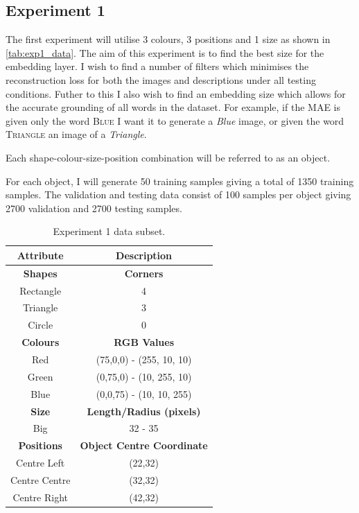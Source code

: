 \subsection{Experiment 1}
The first experiment will utilise 3 colours, 3 positions and 1 size as shown in \autoref{tab:exp1_data}. The aim of this experiment is to find the best size for the embedding layer. I wish to find a number of filters which minimises the reconstruction loss for both the images and descriptions under all testing conditions. Futher to this I also wish to find an embedding size which allows for the accurate grounding of all words in the dataset. For example, if the \ac{MAE} is given only the word \textsc{Blue} I want it to generate a \textit{Blue} image, or given the word \textsc{Triangle} an image of a \textit{Triangle}. 

Each shape-colour-size-position combination will be referred to as an object.

For each object, I will generate 50 training samples giving a total of 1350 training samples. The validation and testing data consist of 100 samples per object giving 2700 validation and 2700 testing samples.



\begin{table}[ht]
\centering
\begin{tabular}{|c|c|}
\hline
\textbf{Attribute} & \textbf{Description} \\ \hline \hline
\textbf{Shapes} & \textbf{Corners} \\ \hline
Rectangle & 4\\ \hline
Triangle & 3\\ \hline
Circle & 0\\ \hline 

\textbf{Colours} & \textbf{RGB Values}	\\ \hline	
Red & (75,0,0) - (255, 10, 10)\\ \hline
Green  & (0,75,0) - (10, 255, 10)\\ \hline
Blue   & (0,0,75) - (10, 10, 255)\\ \hline


\textbf{Size} & 	\textbf{Length/Radius (pixels)} \\ \hline			  
Big    & 32 - 35  \\ \hline


\textbf{Positions} & \textbf{Object Centre Coordinate}	\\ \hline				  
Centre Left &(22,32)\\ \hline
Centre Centre & (32,32)\\ \hline
Centre Right &(42,32)\\ \hline
				
\end{tabular}
\caption{Experiment 1 data subset.}
\label{tab:exp1_data} 
\end{table}

